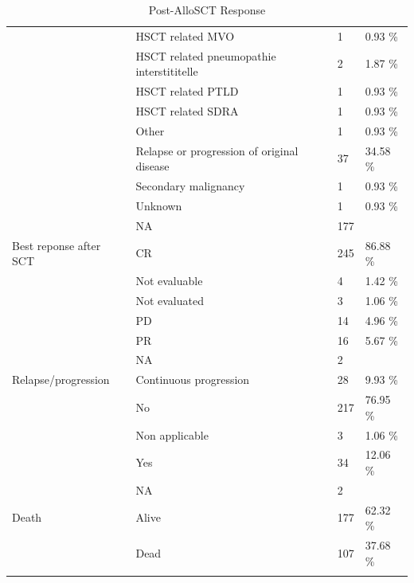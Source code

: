 \documentclass[a4paper,11pt] {article}
\begin{document}
\begin{longtable}{llll}
   & HSCT related MVO & 1 & 0.93 \% \\ 
   & HSCT related pneumopathie interstititelle & 2 & 1.87 \% \\ 
   & HSCT related PTLD & 1 & 0.93 \% \\ 
   & HSCT related SDRA & 1 & 0.93 \% \\ 
   & Other & 1 & 0.93 \% \\ 
   & Relapse or progression of original disease & 37 & 34.58 \% \\ 
   & Secondary malignancy & 1 & 0.93 \% \\ 
   & Unknown & 1 & 0.93 \% \\ 
   & NA & 177 &  \\ 
  Best reponse after SCT & CR & 245 & 86.88 \% \\ 
   & Not evaluable & 4 & 1.42 \% \\ 
   & Not evaluated & 3 & 1.06 \% \\ 
   & PD & 14 & 4.96 \% \\ 
   & PR & 16 & 5.67 \% \\ 
   & NA & 2 &  \\ 
  Relapse/progression & Continuous progression & 28 & 9.93 \% \\ 
   & No & 217 & 76.95 \% \\ 
   & Non applicable  & 3 & 1.06 \% \\ 
   & Yes & 34 & 12.06 \% \\ 
   & NA & 2 &  \\ 
  Death & Alive & 177 & 62.32 \% \\ 
   & Dead & 107 & 37.68 \% \\ 
   \hline
\hline
\caption{Post-AlloSCT Response} 
\label{tab:pg}
\end{longtable}
\end{document}
